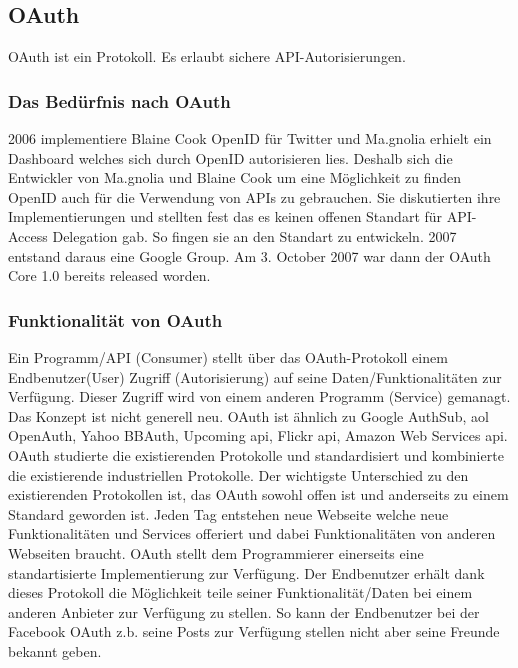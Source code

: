 \newpage

\hypertarget{oauth}{\subsection{OAuth}\label{oauth}}

OAuth ist ein Protokoll. Es erlaubt sichere API-Autorisierungen.

\subsubsection{Das Bedürfnis nach
OAuth}\label{das-beduxfcrfnis-nach-oauth}

2006 implementiere Blaine Cook OpenID für Twitter und Ma.gnolia erhielt
ein Dashboard welches sich durch OpenID autorisieren lies. Deshalb sich
die Entwickler von Ma.gnolia und Blaine Cook um eine Möglichkeit zu
finden OpenID auch für die Verwendung von APIs zu gebrauchen. Sie
diskutierten ihre Implementierungen und stellten fest das es keinen
offenen Standart für API-Access Delegation gab. So fingen sie an den
Standart zu entwickeln. 2007 entstand daraus eine Google Group. Am 3.
October 2007 war dann der OAuth Core 1.0 bereits released worden.

\subsubsection{Funktionalität von
OAuth}\label{funktionalituxe4t-von-oauth}

Ein Programm/API (Consumer) stellt über das OAuth-Protokoll einem
Endbenutzer(User) Zugriff (Autorisierung) auf seine
Daten/Funktionalitäten zur Verfügung. Dieser Zugriff wird von einem
anderen Programm (Service) gemanagt. Das Konzept ist nicht generell neu.
OAuth ist ähnlich zu Google AuthSub, aol OpenAuth, Yahoo BBAuth,
Upcoming api, Flickr api, Amazon Web Services api. OAuth studierte die
existierenden Protokolle und standardisiert und kombinierte die
existierende industriellen Protokolle. Der wichtigste Unterschied zu den
existierenden Protokollen ist, das OAuth sowohl offen ist und anderseits
zu einem Standard geworden ist. Jeden Tag entstehen neue Webseite welche
neue Funktionalitäten und Services offeriert und dabei Funktionalitäten
von anderen Webseiten braucht. OAuth stellt dem Programmierer einerseits
eine standartisierte Implementierung zur Verfügung. Der Endbenutzer
erhält dank dieses Protokoll die Möglichkeit teile seiner
Funktionalität/Daten bei einem anderen Anbieter zur Verfügung zu
stellen. So kann der Endbenutzer bei der Facebook OAuth z.b. seine Posts
zur Verfügung stellen nicht aber seine Freunde bekannt geben.

